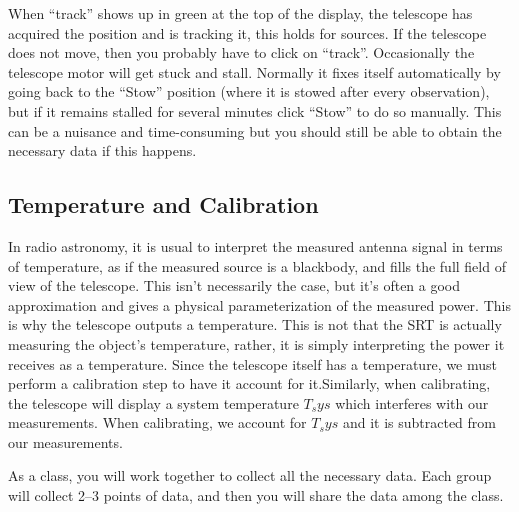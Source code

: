 When “track” shows up in green at the top of the display, the telescope has
acquired the position and is tracking it, this holds for sources. If the telescope
does not move, then you probably have to click on “track”.
Occasionally the telescope motor will get stuck and stall. Normally it fixes
itself automatically by going back to the “Stow” position (where it is stowed after
every observation), but if it remains stalled for several minutes click “Stow” to do
so manually. This can be a nuisance and time-consuming but you should still be
able to obtain the necessary data if this happens.

\subsection{Temperature and Calibration} 

In radio astronomy, it is usual to interpret the measured antenna signal in
terms of temperature, as if the measured source is a blackbody, and fills the full
field of view of the telescope. This isn’t necessarily the case, but it’s often a good
approximation and gives a physical parameterization of the measured power. This is why the telescope outputs a temperature. This is not that the SRT is actually measuring the object's temperature, rather, it is simply interpreting the power it receives as a temperature. Since the telescope itself has a temperature, we must perform a calibration step to have it account for it.Similarly, when calibrating, the telescope will display a system temperature $T_sys$ which interferes with our measurements. When calibrating, we account for $T_sys$ and it is subtracted from our measurements. 

\begin{framed}
As a class, you will work together to collect all the necessary data. Each group will collect 2--3 points of data, and then you will share the data among the class.
\end{framed}

